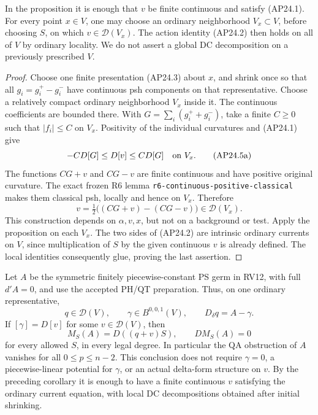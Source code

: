\begin{corollary}
In the proposition it is enough that \(v\) be finite continuous
and satisfy (AP24.1).  For every point \(x\in V\), one may
choose an ordinary neighborhood \(V_x\subset V\), before
choosing \(S\), on which \(v\in\mathcal D(V_x)\).
The action identity (AP24.2) then holds on all of \(V\) by
ordinary locality.  We do not assert a global DC decomposition
on a previously prescribed \(V\).
\end{corollary}

\begin{proof}
Choose one finite presentation (AP24.3) about \(x\), and shrink
once so that all \(g_i=g_i^+-g_i^-\) have continuous psh
components on that representative.  Choose a relatively compact
ordinary neighborhood \(V_x\) inside it.  The continuous
coefficients are bounded there.  With
\(G=\sum_i(g_i^++g_i^-)\), take a finite \(C\ge0\)
such that \(|f_i|\le C\) on \(V_x\).  Positivity of the
individual curvatures and (AP24.1) give
\[
                -CD[G]\le D[v]\le CD[G]
                    \quad\hbox{on }V_x.                  \tag{AP24.5a}
\]
The functions \(CG+v\) and \(CG-v\) are finite continuous
and have positive original curvature.  The exact frozen R6
lemma \texttt{r6-continuous-positive-classical} makes them
classical psh, locally and hence on \(V_x\).  Therefore
\[
              v=\tfrac12\bigl((CG+v)-(CG-v)\bigr)
                              \in\mathcal D(V_x).          \tag{AP24.5b}
\]
This construction depends on \(\alpha,v,x\), but not on a
background or test.  Apply the proposition on each \(V_x\).
The two sides of (AP24.2) are intrinsic ordinary currents on
\(V\), since multiplication of \(S\) by the given continuous
\(v\) is already defined.  The local identities consequently
glue, proving the last assertion.
\end{proof}

\begin{corollary}
Let \(A\) be the symmetric finitely piecewise-constant PS germ
in RV12, with full \(d'A=0\), and use the accepted PH/QT
preparation.  Thus, on one ordinary representative,
\[
       q\in\mathcal D(V),\qquad
       \gamma\in B^{0,0,1}(V),\qquad
       D_\delta q=A-\gamma .                              \tag{AP24.6}
\]
If \([\gamma]=D[v]\) for some \(v\in\mathcal D(V)\), then
\[
             M_S(A)=D((q+v)S),\qquad D M_S(A)=0            \tag{AP24.7}
\]
for every allowed \(S\), in every legal degree.  In particular
the QA obstruction of \(A\) vanishes for all
\(0\le p\le n-2\).  This conclusion does not require
\(\gamma=0\), a piecewise-linear potential for \(\gamma\),
or an actual delta-form structure on \(v\).
By the preceding corollary it is enough to have a finite
continuous \(v\) satisfying the ordinary current equation,
with local DC decompositions obtained after initial shrinking.
\end{corollary}

